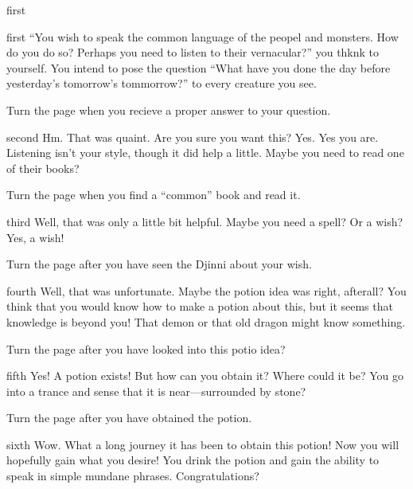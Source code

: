 \documentclass[notebook]{guildcamp2} %
\begin{document}
\startnotebook{\nspeaknormal{}}

\begin{page}{first}
\end{page}

\begin{page}{first}
``You wish to speak the common language of the peopel and monsters. How do you do so? Perhaps you need to listen to their vernacular?'' you thknk to yourself. You intend to pose the question ``What have you done the day before yesterday's tomorrow's tommorrow?'' to every creature you see.

Turn the page when you recieve a proper answer to your question.
\end{page}

\begin{page}{second}
Hm. That was quaint. Are you sure you want this? Yes. Yes you are. Listening isn't your style, though it did help a little. Maybe you need to read one of their books?

Turn the page when you find a ``common'' book and read it.
\end{page}

\begin{page}{third}
Well, that was only a little bit helpful. Maybe you need a spell? Or a wish? Yes, a wish!

Turn the page after you have seen the Djinni about your wish.
\end{page}

\begin{page}{fourth}
Well, that was unfortunate. Maybe the potion idea was right, afterall? You think that you would know how to make a potion about this, but it seems that knowledge is beyond you! That demon or that old dragon might know something.

Turn the page after you have looked into this potio idea?
\end{page}

\begin{page}{fifth}
Yes! A potion exists! But how can you obtain it? Where could it be? You go into a trance and sense that it is near---surrounded by stone?

Turn the page after you have obtained the potion.
\end{page}

\begin{page}{sixth}
Wow. What a long journey it has been to obtain this potion! Now you will hopefully gain what you desire! You drink the potion and gain the ability to speak in simple mundane phrases. Congratulations?
\end{page}

\endnotebook
\end{document}

